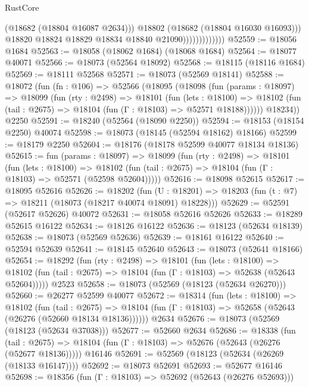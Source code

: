 \begin{lexlean}{RustCore}
\begin{coremodule}
                                  (@18682 (@18804 @16087 @2634)))
                                @18802
                                (@18682 (@18804 @16030 @16093)))
                              @18820
                              @18824
                              @18829
                              @18834
                              @18840
                              @21090)))))))))))))
@52559 := @18056 @1684
@52563 := @18058 (@18062 @1684) (@18068 @1684)
@52564 := @18077 @40071
@52566 := @18073 (@52564 @18092)
@52568 := @18115 (@18116 @1684)
@52569 := @18111 @52568
@52571 := @18073 (@52569 @18141)
@52588 := @18072
    (fun (fn : @106) =>
    @52566
      (@18095
        (@18098
          (fun (params : @18097) =>
          @18099
            (fun (rty : @2498) =>
            @18101
              (fun (lets : @18100) =>
              @18102 (fun (tail : @2675) => @18104 (fun (Γ : @18103) => @52571 @18188))))))
        @18234))
    @2250
@52591 := @18240 (@52564 (@18090 @2250))
@52594 := @18153 (@18154 @2250) @40074
@52598 := @18073 (@18145 (@52594 @18162) @18166)
@52599 := @18179 @2250
@52604 := @18176 (@18178 @52599 @40077 @18134 @18136)
@52615 := fun (params : @18097) =>
  @18099
    (fun (rty : @2498) =>
    @18101
      (fun (lets : @18100) =>
      @18102 (fun (tail : @2675) => @18104 (fun (Γ : @18103) => @52571 (@52598 @52604)))))
@52616 := @18098 @52615
@52617 := @18095 @52616
@52626 := @18202
    (fun (U : @18201) => @18203 (fun (t : @7) => @18211 (@18073 (@18217 @40074 @18091) @18228)))
@52629 := @52591 (@52617 @52626) @40072
@52631 := @18058 @52616 @52626
@52633 := @18289 @52615 @16122
@52634 := @18126 @16122
@52636 := @18123 (@52634 @18139)
@52638 := @18073 (@52569 @52636)
@52639 := @18161 @16122
@52640 := @52594 @52639
@52641 := @18145 @52640
@52643 := @18073 (@52641 @18166)
@52654 := @18292
    (fun (rty : @2498) =>
    @18101
      (fun (lets : @18100) =>
      @18102 (fun (tail : @2675) => @18104 (fun (Γ : @18103) => @52638 (@52643 @52604)))))
    @2523
@52658 := @18073 (@52569 (@18123 (@52634 @26270)))
@52660 := @26277 @52599 @40077
@52672 := @18314
    (fun (lets : @18100) =>
    @18102
      (fun (tail : @2675) =>
      @18104 (fun (Γ : @18103) => @52658 (@52643 (@26276 (@52660 @18134 @18136))))))
    @2634
@52676 := @18073 (@52569 (@18123 (@52634 @37038)))
@52677 := @52660 @2634
@52686 := @18338
    (fun (tail : @2675) => @18104 (fun (Γ : @18103) => @52676 (@52643 (@26276 (@52677 @18136)))))
    @16146
@52691 := @52569 (@18123 (@52634 (@26269 (@18133 @16147))))
@52692 := @18073 @52691
@52693 := @52677 @16146
@52698 := @18356 (fun (Γ : @18103) => @52692 (@52643 (@26276 @52693)))

\end{coremodule}
\end{lexlean}
